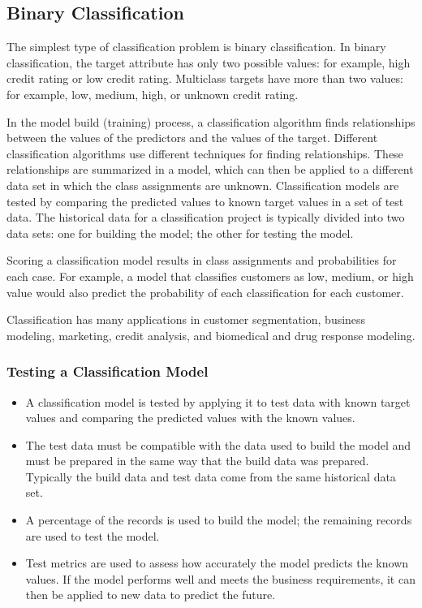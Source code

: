 \subsection{Binary Classification}
The simplest type of classification problem is binary classification. In binary classification, the target attribute has only two possible values: for example, high credit rating or low credit rating. Multiclass targets have more than two values: for example, low, medium, high, or unknown credit rating.

In the model build (training) process, a classification algorithm finds relationships between the values of the predictors and the values of the target. Different classification algorithms use different techniques for finding relationships. These relationships are summarized in a model, which can then be applied to a different data set in which the class assignments are unknown.
Classification models are tested by comparing the predicted values to known target values in a set of test data. The historical data for a classification project is typically divided into two data sets: one for building the model; the other for testing the model.

Scoring a classification model results in class assignments and probabilities for each case. For example, a model that classifies customers as low, medium, or high value would also predict the probability of each classification for each customer.

Classification has many applications in customer segmentation, business modeling, marketing, credit analysis, and biomedical and drug response modeling.

\subsubsection{Testing a Classification Model}
\begin{itemize}
\item A classification model is tested by applying it to test data with known target values and comparing the predicted values with the known values.
\item The test data must be compatible with the data used to build the model and must be prepared in the same way that the build data was prepared. Typically the build data and test data come from the same historical data set. \item A percentage of the records is used to build the model; the remaining records are used to test the model.
\item Test metrics are used to assess how accurately the model predicts the known values. If the model performs well and meets the business requirements, it can then be applied to new data to predict the future.
\end{itemize}

